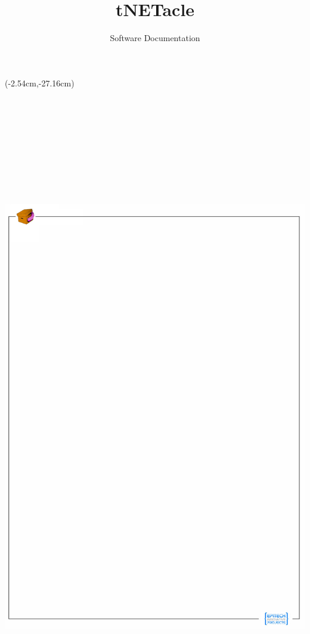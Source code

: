 \documentclass[11pt]{tnetacle-en}
\title {tNETacle}
\subtitle{Software Documentation}
\date {}
\begin{document}
\summary{}

\maketitle

\fancyput(-2.54cm,-27.16cm){
\includegraphics[width=21cm,height=29.7cm]{back-tnetacle-eip.jpeg}
}


\tableofcontents








\end{document}
